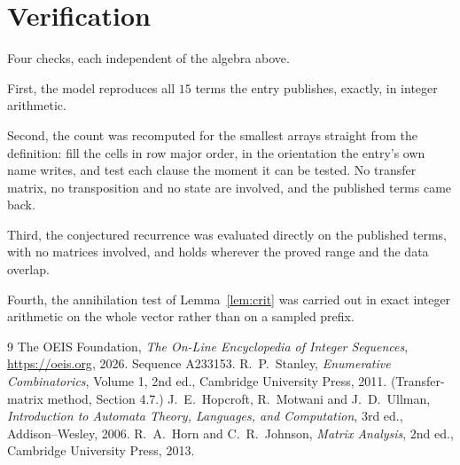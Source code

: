 \documentclass[11pt,a4paper]{article}
\theoremstyle{plain}
\theoremstyle{definition}
\begin{document}
\section{Verification}

Four checks, each independent of the algebra above.

First, the model reproduces all $15$ terms the entry publishes, exactly, in integer
arithmetic.

Second, the count was recomputed for the smallest arrays straight from the definition: fill the
cells in row major order, in the orientation the entry's own name writes, and test each clause
the moment it can be tested. No transfer matrix, no transposition and no state are involved,
and the published terms came back.

Third, the conjectured recurrence was evaluated directly on the published terms, with no
matrices involved, and holds wherever the proved range and the data overlap.

Fourth, the annihilation test of Lemma~\ref{lem:crit} was carried out in exact integer
arithmetic on the whole vector rather than on a sampled prefix.

\begin{thebibliography}{9}
 The OEIS Foundation, \emph{The On-Line Encyclopedia of Integer
Sequences}, \url{https://oeis.org}, 2026. Sequence A233153.
 R.~P.~Stanley, \emph{Enumerative Combinatorics}, Volume 1, 2nd ed.,
Cambridge University Press, 2011. (Transfer-matrix method, Section 4.7.)
 J.~E.~Hopcroft, R.~Motwani and J.~D.~Ullman, \emph{Introduction to Automata
Theory, Languages, and Computation}, 3rd ed., Addison--Wesley, 2006.
 R.~A.~Horn and C.~R.~Johnson, \emph{Matrix Analysis}, 2nd ed., Cambridge
University Press, 2013.
\end{thebibliography}
\end{document}
